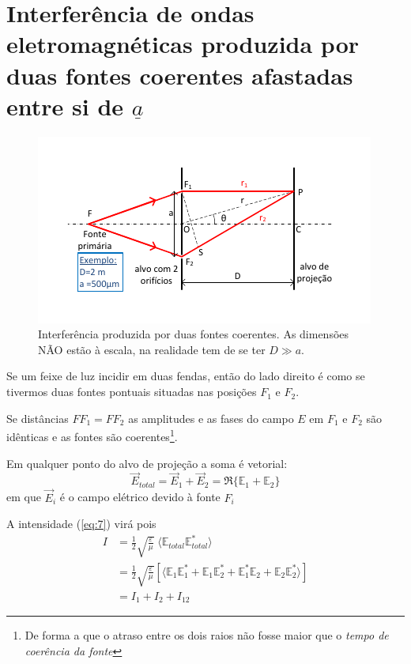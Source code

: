 \documentclass[a4paper,12pt]{article}
\begin{document}
\section{\sf Interferência de ondas eletromagnéticas produzida por duas fontes coerentes afastadas entre si de $\underline{a}$ }
\begin{figure}[h!tb]
	\centering 
	\includegraphics[width=0.8
	\textwidth]{interf} \caption{Interferência produzida por duas fontes coerentes. As dimensões NÃO estão à escala, na realidade tem de se ter $D \gg a$. \label{fig:1}} 
\end{figure}

Se um feixe de luz incidir em duas fendas, então do lado direito é como se tivermos duas fontes pontuais situadas nas posições $F_1$ e $F_2$.

Se distâncias $F F_1 = F F_2$ as amplitudes e as fases do campo $E$ em $F_1$ e $F_2$ são idênticas e as fontes são coerentes\footnote{De forma a que o atraso entre os dois raios não fosse maior que o \emph{tempo de coerência da fonte}}.

Em qualquer ponto do alvo de projeção a soma é vetorial: 
\begin{equation}
	\label{eq:8} \vec{E}_{total} = \vec{E}_1 + \vec{E}_2  = \Re \{ \mathbb{E}_1 + \mathbb{E}_2 \} 
\end{equation}
em que $\vec{E}_i$ é o campo elétrico devido à fonte $F_i$

A intensidade (\ref{eq:7}) virá pois 
\begin{align}
	I &= \frac{1}{2}\sqrt{\frac{ \varepsilon}{\mu}} \; \langle \mathbb{E}_{total} \mathbb{E}^*_{total} \rangle \nonumber \\
	&= \frac{1}{2}\sqrt{\frac{ \varepsilon}{\mu}} \left[ \langle \mathbb{E}_1 \mathbb{E}^*_1 + \mathbb{E}_1 \mathbb{E}^*_2 + \mathbb{E}^*_1 \mathbb{E}_2 + \mathbb{E}_2 \mathbb{E}^*_2 \rangle \right] \nonumber \\
	&= I_1 + I_2 +I_{12} 
\end{align}
\end{document}
